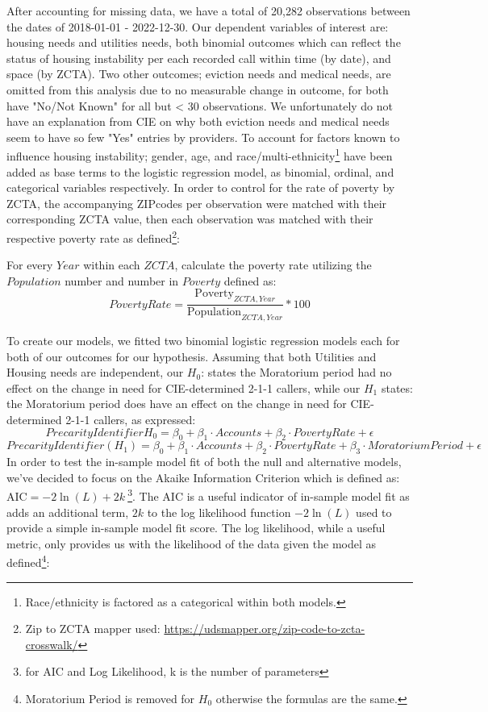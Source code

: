 \documentclass[man, 12pt, donotrepeattitle, floatsintext]{apa7} %
\begin{document}
 After accounting for missing data, we have a total of 20,282 observations between the dates of 2018-01-01 - 2022-12-30. Our dependent variables of interest are: housing needs and utilities needs, both binomial outcomes which can reflect the status of housing instability per each recorded call within time (by date), and space (by ZCTA). Two other outcomes; eviction needs and medical needs, are omitted from this analysis due to no measurable change in outcome, for both have "No/Not Known" for all but < 30 observations. We unfortunately do not have an explanation from CIE on why both eviction needs and medical needs seem to have so few "Yes" entries by providers. To account for factors known to influence housing instability; gender, age, and race/multi-ethnicity\footnote{Race/ethnicity is factored as a categorical within both models.} have been added as base terms to the logistic regression model, as binomial, ordinal, and categorical variables respectively. In order to control for the rate of poverty by ZCTA, the accompanying ZIPcodes per observation were matched with their corresponding ZCTA value, then each observation was matched with their respective poverty rate as defined\footnote{Zip to ZCTA mapper used: \url{https://udsmapper.org/zip-code-to-zcta-crosswalk/}}:

For every $Year$ within each $ZCTA$, calculate the poverty rate utilizing the $Population$ number and number in $Poverty$ defined as:
$$Poverty Rate = \frac{{\text{Poverty}_{ZCTA, Year}}}{{\text{Population}_{ZCTA, Year}}} * 100$$

	To create our models, we fitted two binomial logistic regression models each for both of our outcomes for our hypothesis. Assuming that both Utilities and Housing needs are independent, our $H_{0}$: states the Moratorium period had no effect on the change in need for CIE-determined 2-1-1 callers, while our $H_{1}$ states: the Moratorium period does have an effect on the change in need for CIE-determined 2-1-1 callers, as expressed:
$$Precarity Identifier{H_0} = \beta_0 + \beta_1 \cdot Accounts + \beta_2 \cdot Poverty Rate + \epsilon$$
$$Precarity Identifier(H_1) = \beta_0 + \beta_1 \cdot Accounts + \beta_2 \cdot Poverty Rate + \beta_3 \cdot Moratorium Period + \epsilon$$
In order to test the in-sample model fit of both the null and alternative models, we've decided to focus on the Akaike Information Criterion which is defined as: $\text{AIC} = -2 \ln(L) + 2k\:$\footnote{for AIC and Log Likelihood, k is the number of parameters}. The AIC is a useful indicator of in-sample model fit as adds an additional term, $2k$ to the log likelihood function $-2 \ln(L)$ used to provide a simple in-sample model fit score. The log likelihood, while a useful metric, only provides us with the likelihood of the data given the model as defined\footnote{Moratorium Period is removed for $H_{0}$ otherwise the formulas are the same.}:
\end{document}
